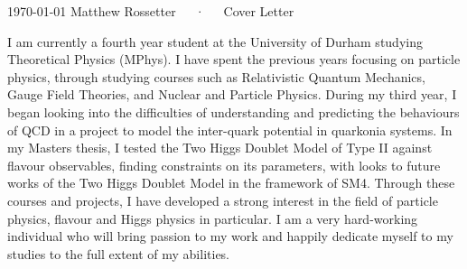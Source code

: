 \documentclass[11pt, a4paper]{awesome-cv}
\begin{document}
\makecvheader[R]

\makecvfooter
  {\today}
  {Matthew Rossetter~~~·~~~Cover Letter}
  {}

\makelettertitle

\begin{cvletter}

I am currently a fourth year student at the University of Durham studying Theoretical Physics (MPhys). 
I have spent the previous years focusing on particle physics, through studying courses such as Relativistic Quantum Mechanics, Gauge Field Theories, and Nuclear and Particle Physics. 
During my third year, I began looking into the difficulties of understanding and predicting the behaviours of QCD in a project to model the inter-quark potential in quarkonia systems.
In my Masters thesis, I tested the Two Higgs Doublet Model of Type II against flavour observables, finding constraints on its parameters, with looks to future works of the Two Higgs Doublet Model in the framework of SM4. 
Through these courses and projects, I have developed a strong interest in the field of particle physics, flavour and Higgs physics in particular. 
I am a very hard-working individual who will bring passion to my work and happily dedicate myself to my studies to the full extent of my abilities. 



\end{cvletter}
\end{document}
